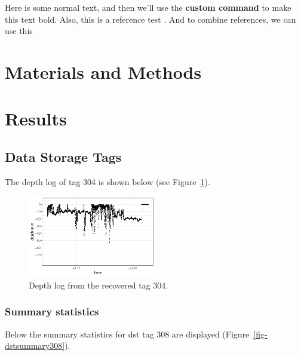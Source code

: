 \documentclass[
  authoryear,
  review,
  3p]{elsarticle}
\newcommand{\mycommand}[1]{\textbf{#1}}
\begin{document}
Here is some normal text, and then we'll use the
\mycommand{custom command} to make this text bold. Also, this is a
reference test \citet{dodge_2013}. And to combine references, we can use
this \citep{nathan_2008, dodge_2013}

\hypertarget{materials-and-methods}{%
\section{Materials and Methods}\label{materials-and-methods}}

\hypertarget{results}{%
\section{Results}\label{results}}

\hypertarget{data-storage-tags}{%
\subsection{Data Storage Tags}\label{data-storage-tags}}

The depth log of tag 304 is shown below (see Figure~\ref{fig-dst304}).

\begin{figure}

{\centering \includegraphics[width=0.5\textwidth,height=\textheight]{index_files/figure-pdf/fig-dst304-1.pdf}

}

\caption{\label{fig-dst304}Depth log from the recovered tag 304.}

\end{figure}

\hypertarget{summary-statistics}{%
\subsubsection{Summary statistics}\label{summary-statistics}}

Below the summary statistics for dst tag 308 are displayed
(Figure~\ref{fig-dstsummary308}).
\end{document}
